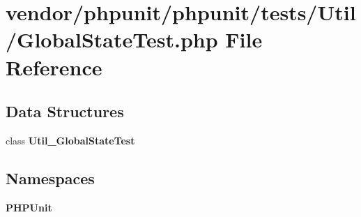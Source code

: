 \section{vendor/phpunit/phpunit/tests/\+Util/\+Global\+State\+Test.php File Reference}
\label{_global_state_test_8php}
\subsection*{Data Structures}
\begin{DoxyCompactItemize}
\item 
class {\bf Util\+\_\+\+Global\+State\+Test}
\end{DoxyCompactItemize}
\subsection*{Namespaces}
\begin{DoxyCompactItemize}
\item 
 {\bf P\+H\+P\+Unit}
\end{DoxyCompactItemize}

